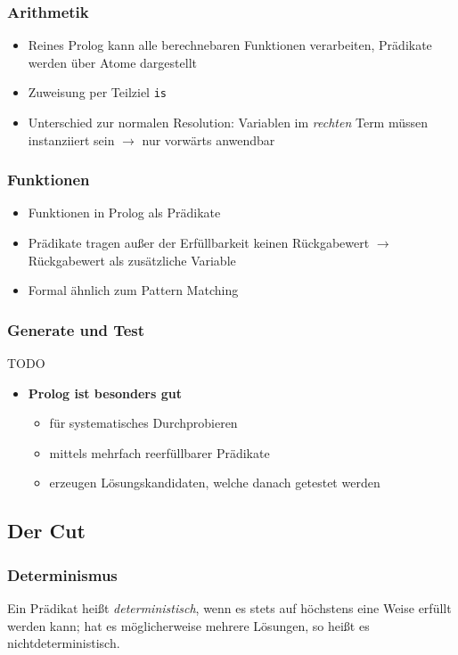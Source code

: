\subsubsection{Arithmetik}
\begin{itemize}
	\item Reines Prolog kann alle berechnebaren Funktionen verarbeiten, Prädikate werden über Atome dargestellt
	\item Zuweisung per Teilziel \texttt{is}
	\item Unterschied zur normalen Resolution: Variablen im \textit{rechten} Term müssen instanziiert sein \(\rightarrow\) nur vorwärts anwendbar
\end{itemize}

\subsubsection{Funktionen}
\begin{itemize}
	\item Funktionen in Prolog als Prädikate
	\item Prädikate tragen außer der Erfüllbarkeit keinen Rückgabewert \(\rightarrow\) Rückgabewert als zusätzliche Variable
	\item Formal ähnlich zum Pattern Matching
\end{itemize}

\subsubsection{Generate und Test}
TODO
\begin{itemize}
	\item \textbf{Prolog ist besonders gut}
	\begin{itemize}
		\item für systematisches Durchprobieren
		\item mittels mehrfach reerfüllbarer Prädikate
		\item erzeugen Lösungskandidaten, welche danach getestet werden
	\end{itemize}
\end{itemize}


\subsection{Der Cut}

\subsubsection{Determinismus}
Ein Prädikat heißt \textit{deterministisch}, wenn es stets auf höchstens eine Weise erfüllt werden kann; hat es möglicherweise mehrere Lösungen, so heißt es nichtdeterministisch.

